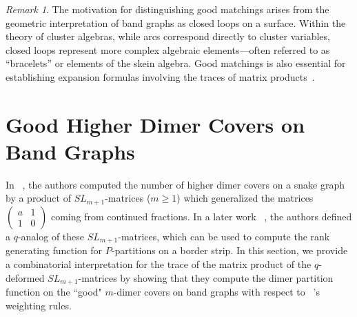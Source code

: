 \documentclass[11pt]{amsart}
\newcommand\m[1]{\begin{pmatrix}#1\end{pmatrix}}
\theoremstyle{definition}
\theoremstyle{remark}
\newtheorem{rem}[thm]{Remark}
\numberwithin{equation}{section}
\begin{document}
\begin{rem}
    
The motivation for distinguishing good matchings arises from the geometric interpretation of band graphs as closed loops on a surface. Within the theory of cluster algebras, while arcs correspond directly to cluster variables, closed loops represent more complex algebraic elements—often referred to as ``bracelets'' or elements of the skein algebra. Good matchings is also essential for establishing expansion formulas involving the traces of matrix products~\cite{ezgieminecluster2024}.

\end{rem}

\section{Good Higher Dimer Covers on Band Graphs}\label{sec:good_higher_dimer}

In ~\cite{Musiker2023HigherDC}, the authors computed the number of higher dimer covers on a snake graph by a product of $SL_{m+1}$-matrices ($m\geq 1$) which generalized the matrices $\m{a&1\\1&0}$ coming from continued fractions. In a later work ~\cite{BOSZ26}, the authors defined a $q$-analog of these $SL_{m+1}$-matrices, which can be used to compute the rank generating function for $P$-partitions on a border strip. In this section, we provide a combinatorial interpretation for the trace of the matrix product of the $q$-deformed $SL_{m+1}$-matrices by showing that they compute the dimer partition function on the ``good" $m$-dimer covers on band graphs with respect to ~\cite{ovsienko2025qrationalsdimers}'s weighting rules.
\end{document}

